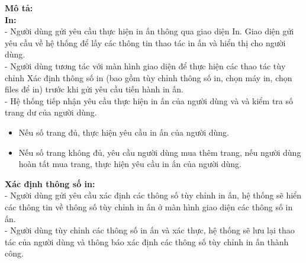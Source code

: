 \documentclass[a4paper]{article}
\begin{document}
\noindent \textbf{Mô tả:}\\
\noindent \textbf{In:}\\
\noindent - Người dùng gửi yêu cầu thực hiện in ấn thông qua giao diện In. Giao diện gửi yêu cầu về hệ thống để lấy các thông tin thao tác in ấn và hiển thị cho người dùng.\\
\noindent - Người dùng tương tác với màn hình giao diện để thực hiện các thao tác tùy chỉnh Xác định thông số in (bao gồm tùy chỉnh thông số in, chọn máy in, chọn files để in) trước khi gửi yêu cầu tiến hành in ấn.\\
\noindent - Hệ thống tiếp nhận yêu cầu thực hiện in ấn của người dùng và và kiểm tra số trang dư của người dùng.
\begin{itemize}
    \item Nếu số trang đủ, thực hiện yêu cầu in ấn của người dùng.

    \item Nếu số trang không đủ, yêu cầu người dùng mua thêm trang, nếu người dùng hoàn tất mua trang, thực hiện yêu cầu in ấn của người dùng.
\end{itemize}


\noindent \textbf{Xác định thông số in:}\\
\noindent - Người dùng gửi yêu cầu xác định các thông số tùy chỉnh in ấn, hệ thống sẽ hiển các thông tin về thông số tùy chỉnh in ấn ở màn hình giao diện các thông số in ấn.\\
\noindent - Người dùng tùy chỉnh các thông số in ấn và xác thực, hệ thống sẽ lưu lại thao tác của người dùng và thông báo xác định các thông số tùy chỉnh in ấn thành công.\\
\newpage
\end{document}
